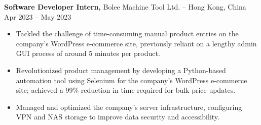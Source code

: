 \textbf{Software Developer Intern,} {Bolee Machine Tool Ltd.} -- Hong Kong, China \hfill Apr 2023 -- May 2023 \\
\vspace{-9pt}
\begin{itemize}
  \item Tackled the challenge of time-consuming manual product entries on the company’s WordPress e-commerce site, previously reliant on a lengthy admin GUI process of around 5 minutes per product.
  \item Revolutionized product management by developing a Python-based automation tool using Selenium for the company’s
  WordPress e-commerce site; achieved a 99\% reduction in time required for bulk price updates.
  \item Managed and optimized the company’s server infrastructure, configuring VPN and NAS storage to improve data security and accessibility.
\end{itemize}